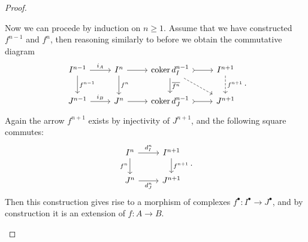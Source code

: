 \documentclass[../Main]{subfiles}
\begin{document}
\begin{proof}
\begin{description}
	Now we can procede by induction on $n \geq 1$.
	Assume that we have constructed $f^{n-1}$ and $f^n$, then reasoning similarly to before we obtain
	the commutative diagram
	\begin{equation}
	\begin{tikzcd}
		I^{n-1} \arrow[r, "i_A", rightarrow] 
		\arrow[d, "f^{n-1}", rightarrow] &
		I^n \arrow[d, "f^n", rightarrow] 
		\arrow[r, "", rightarrow] &
		\coker d^{n-1}_I \arrow[r, "", rightarrowtail] 
		\arrow[d, "\overline{f^n}", rightarrow] 
		\arrow[rd, "", dashrightarrow] &
		I^{n+1} \arrow[d, "f^{n+1}", dashrightarrow] \\
		J^{n-1} \arrow[r, "i_B", rightarrow] &
		J^n \arrow[r, "", rightarrow] &
		\coker d^{n-1}_J \arrow[r, "", rightarrowtail] &
		J^{n+1}
	\end{tikzcd}
	.\end{equation} 
	Again the arrow $f^{n+1}$ exists by injectivity of $J^{n+1}$, and the following square commutes:
	\begin{equation}
	\begin{tikzcd}
		I^n \arrow[r, "d^n_I", rightarrow] \arrow[d, "f^n"', rightarrow] &
		I^{n+1} \arrow[d, "f^{n+1}", rightarrow] \\
		J^n \arrow[r, "d^n_J"', rightarrow] &
		J^{n+1}
	\end{tikzcd}
	.\end{equation} 
	Then this construction gives rise to a morphism of complexes $f^\bullet\colon I^\bullet \to J^\bullet$,
	and by construction it is an extension of $f\colon A \to B$.\qedhere
	\end{description} 
\end{proof}
\end{document}

